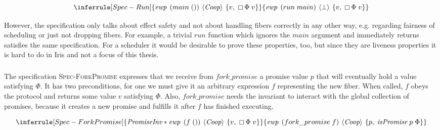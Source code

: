 \[
  \inferrule[Spec-Run]
  {\ewp{main\; ()}{\proto{}}{v,\; \always \Phi\; v}}
  {\ewp{run\; main}{\bot}{v,\; \always \Phi\; v}}
\]


However, the specification only talks about effect safety and not about handling fibers correctly in any other way, e.g. regarding fairness of scheduling or just not dropping fibers.
For example, a trivial \(run\) function which ignores the \(main\) argument and immediately returns satisfies the same specification.
For a scheduler it would be desirable to prove these properties, too, but since they are liveness properties it is hard to do in Iris and not a focus of this thesis.

\subsubsection{}
\label{sec:sched-spec-fork}

The specification \textsc{Spec-ForkPromise} expresses that we receive from \(fork\_promise\) a promise value \(p\) that will eventually hold a value satisfying \(\Phi\).
It has two preconditions, for one we must give it an arbitrary expression \(f\) representing the new fiber.
When called, \(f\) obeys the \proto{} protocol and returns some value \(v\) satisfying \(\Phi\).
Also, \(fork\_promise\) needs the \gsPInv{} invariant to interact with the global collection of promises, because it creates a new promise and fulfills it after \(f\) has finished executing.

\[
  \inferrule[Spec-ForkPromise]
  {\gsPInv{} \ast \ewp{f\;()}{\proto{}}{v,\; \always \Phi\; v}}
  {\ewp{fork\_promise\; f}{\proto{}}{p,\; \gsIsPr{}\; p\; \Phi}}
\]

